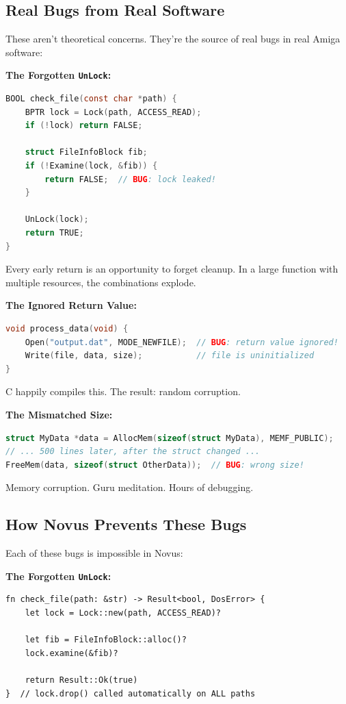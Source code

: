 \subsection{Real Bugs from Real Software}

These aren't theoretical concerns. They're the source of real bugs in real Amiga software:

\textbf{The Forgotten \texttt{UnLock}:}
\begin{lstlisting}[language=C]
BOOL check_file(const char *path) {
    BPTR lock = Lock(path, ACCESS_READ);
    if (!lock) return FALSE;

    struct FileInfoBlock fib;
    if (!Examine(lock, &fib)) {
        return FALSE;  // BUG: lock leaked!
    }

    UnLock(lock);
    return TRUE;
}
\end{lstlisting}

Every early return is an opportunity to forget cleanup. In a large function with multiple resources, the combinations explode.

\textbf{The Ignored Return Value:}
\begin{lstlisting}[language=C]
void process_data(void) {
    Open("output.dat", MODE_NEWFILE);  // BUG: return value ignored!
    Write(file, data, size);           // file is uninitialized
}
\end{lstlisting}

C happily compiles this. The result: random corruption.

\textbf{The Mismatched Size:}
\begin{lstlisting}[language=C]
struct MyData *data = AllocMem(sizeof(struct MyData), MEMF_PUBLIC);
// ... 500 lines later, after the struct changed ...
FreeMem(data, sizeof(struct OtherData));  // BUG: wrong size!
\end{lstlisting}

Memory corruption. Guru meditation. Hours of debugging.

\subsection{How Novus Prevents These Bugs}

Each of these bugs is impossible in Novus:

\textbf{The Forgotten \texttt{UnLock}:}
\begin{lstlisting}
fn check_file(path: &str) -> Result<bool, DosError> {
    let lock = Lock::new(path, ACCESS_READ)?

    let fib = FileInfoBlock::alloc()?
    lock.examine(&fib)?

    return Result::Ok(true)
}  // lock.drop() called automatically on ALL paths
\end{lstlisting}

